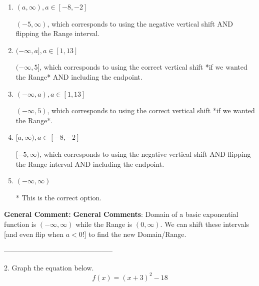 \documentclass{extbook}[14pt]
\begin{document}
\begin{enumerate}[label=\Alph*.] 
\item $ (a, \infty), a \in [-8, -2] $ 

 $(-5, \infty)$, which corresponds to using the negative vertical shift AND flipping the Range interval. 
\item $ (-\infty, a], a \in [1, 13] $ 

 $(-\infty, 5]$, which corresponds to using the correct vertical shift *if we wanted the Range* AND including the endpoint. 
\item $ (-\infty, a), a \in [1, 13] $ 

 $(-\infty, 5)$, which corresponds to using the correct vertical shift *if we wanted the Range*. 
\item $ [a, \infty), a \in [-8, -2] $ 

 $[-5, \infty)$, which corresponds to using the negative vertical shift AND flipping the Range interval AND including the endpoint. 
\item $ (-\infty, \infty) $ 

 * This is the correct option. 
\end{enumerate} 
 
\textbf{General Comment:} \textbf{General Comments}: Domain of a basic exponential function is $(-\infty, \infty)$ while the Range is $(0, \infty)$. We can shift these intervals [and even flip when $a<0$!] to find the new Domain/Range. 

-----------------------------------------------

2. Graph the equation below.
\[ f(x) = (x+3)^2 - 18 \] 
\end{document}
